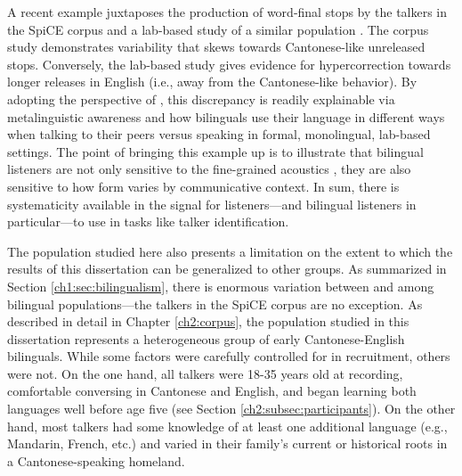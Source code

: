 A recent example juxtaposes the production of word-final stops by the talkers in the SpiCE corpus \citep{johnson_2021_language} and a lab-based study of a similar population \citep{polinsky_2018_heritage}. The corpus study demonstrates variability that skews towards Cantonese-like unreleased stops. Conversely, the lab-based study gives evidence for hypercorrection towards longer releases in English (i.e., away from the Cantonese-like behavior). By adopting the perspective of \citet{bullock_2009_sociophonetics}, this discrepancy is readily explainable via metalinguistic awareness and how bilinguals use their language in different ways when talking to their peers versus speaking in formal, monolingual, lab-based settings. The point of bringing this example up is to illustrate that bilingual listeners are not only sensitive to the fine-grained acoustics \citep{ju_2004_falling}, they are also sensitive to how form varies by communicative context. In sum, there is systematicity available in the signal for listeners---and bilingual listeners in particular---to use in tasks like talker identification. 

The population studied here also presents a limitation on the extent to which the results of this dissertation can be generalized to other groups. As summarized in Section \ref{ch1:sec:bilingualism}, there is enormous variation between and among bilingual populations---the talkers in the SpiCE corpus are no exception. As described in detail in Chapter \ref{ch2:corpus}, the population studied in this dissertation represents a heterogeneous group of early Cantonese-English bilinguals. While some factors were carefully controlled for in recruitment, others were not. On the one hand, all talkers were 18-35 years old at recording, comfortable conversing in Cantonese and English, and began learning both languages well before age five (see Section \ref{ch2:subsec:participants}). On the other hand, most talkers had some knowledge of at least one additional language (e.g., Mandarin, French, etc.) and varied in their family's current or historical roots in a Cantonese-speaking homeland. 

